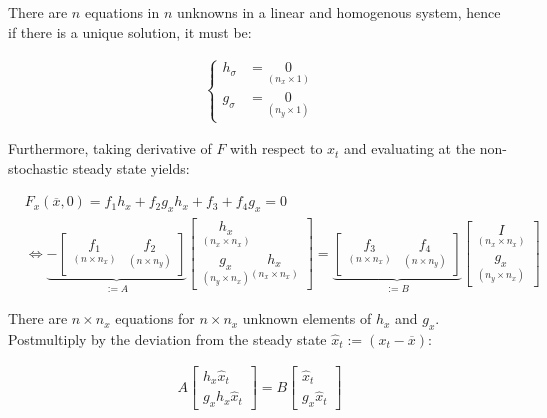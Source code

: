 \documentclass{pracamgr}
\numberwithin{equation}{section}
\begin{document}
There are $n$ equations in $n$ unknowns in a linear and homogenous system, hence if there is a unique solution, it must be:

\begin{align}
\left\{
\begin{array}{cl}
h_\sigma &= \underset{(n_x\times 1)}{0} \\
g_\sigma &= \underset{(n_y \times 1)}{0} 
\end{array}
\right.
\end{align}

Furthermore, taking derivative of $F$ with respect to $x_t$ and evaluating at the non-stochastic steady state yields:

\begin{eqnarray}
&    F_x (\overline{x},0) = f_1 h_x + f_2 g_x h_x + f_3 + f_4 g_x = 0 \nonumber \\
& \iff \underbrace{- \begin{bmatrix} \underset{(n\times n_x)}{f_1} & \underset{(n\times n_y)}{f_2} \end{bmatrix}}_{:=A} \begin{bmatrix} \underset{(n_x\times n_x)}{h_x} \\ \underset{(n_y\times n_x)}{g_x} \underset{(n_x\times n_x)}{h_x} \end{bmatrix}  = \underbrace{\begin{bmatrix} \underset{(n\times n_x)}{f_3} & \underset{(n\times n_y)}{f_4}\end{bmatrix}}_{:=B} \begin{bmatrix} \underset{(n_x\times n_x)}{I} \\\underset{(n_y\times n_x)}{g_x} \end{bmatrix}
\end{eqnarray}
  
There are $n\times n_x$ equations for $n\times n_x$ unknown elements of $h_x$ and $g_x$. Postmultiply by the deviation from the steady state $\widehat{x}_t := (x_t-\overline{x})$:

 \begin{align}
 A \begin{bmatrix} h_x \widehat{x}_t \\ g_x h_x \widehat{x}_t \end{bmatrix} = B \begin{bmatrix} \widehat{x}_t \\ g_x \widehat{x}_t \end{bmatrix}
  \end{align}
\end{document}
